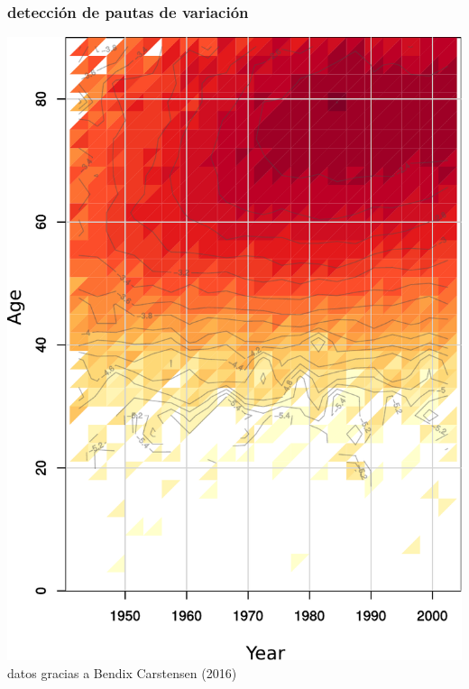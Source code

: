 \documentclass[20pt]{beamer}
\begin{document}
\begin{frame}
\frametitle{detecci\'{o}n de pautas de variaci\'{o}n}
\includegraphics[scale=.7]{Figures/LungCancerDenmark.pdf}\\
datos gracias a Bendix Carstensen (2016)
\end{frame}

\end{document}
